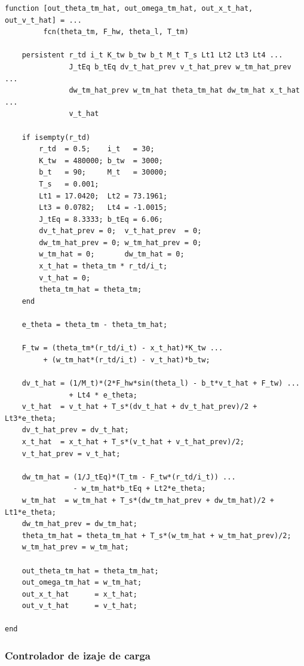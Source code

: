 \documentclass[12pt, a4paper]{article}
\begin{document}
\begin{lstlisting}[style=matlab, basicstyle=\ttfamily\scriptsize, caption={MATLAB Function: observador de Luenberger del carro ($T_{s2}=1$\,ms).}, label=lst:obs-carro]
function [out_theta_tm_hat, out_omega_tm_hat, out_x_t_hat, out_v_t_hat] = ...
         fcn(theta_tm, F_hw, theta_l, T_tm)

    persistent r_td i_t K_tw b_tw b_t M_t T_s Lt1 Lt2 Lt3 Lt4 ...
               J_tEq b_tEq dv_t_hat_prev v_t_hat_prev w_tm_hat_prev ...
               dw_tm_hat_prev w_tm_hat theta_tm_hat dw_tm_hat x_t_hat ...
               v_t_hat

    if isempty(r_td)
        r_td  = 0.5;    i_t   = 30;
        K_tw  = 480000; b_tw  = 3000;
        b_t   = 90;     M_t   = 30000;
        T_s   = 0.001;
        Lt1 = 17.0420;  Lt2 = 73.1961;
        Lt3 = 0.0782;   Lt4 = -1.0015;
        J_tEq = 8.3333; b_tEq = 6.06;
        dv_t_hat_prev = 0;  v_t_hat_prev  = 0;
        dw_tm_hat_prev = 0; w_tm_hat_prev = 0;
        w_tm_hat = 0;       dw_tm_hat = 0;
        x_t_hat = theta_tm * r_td/i_t;
        v_t_hat = 0;
        theta_tm_hat = theta_tm;
    end

    e_theta = theta_tm - theta_tm_hat;

    F_tw = (theta_tm*(r_td/i_t) - x_t_hat)*K_tw ...
         + (w_tm_hat*(r_td/i_t) - v_t_hat)*b_tw;

    dv_t_hat = (1/M_t)*(2*F_hw*sin(theta_l) - b_t*v_t_hat + F_tw) ...
               + Lt4 * e_theta;
    v_t_hat  = v_t_hat + T_s*(dv_t_hat + dv_t_hat_prev)/2 + Lt3*e_theta;
    dv_t_hat_prev = dv_t_hat;
    x_t_hat  = x_t_hat + T_s*(v_t_hat + v_t_hat_prev)/2;
    v_t_hat_prev = v_t_hat;

    dw_tm_hat = (1/J_tEq)*(T_tm - F_tw*(r_td/i_t)) ...
                - w_tm_hat*b_tEq + Lt2*e_theta;
    w_tm_hat  = w_tm_hat + T_s*(dw_tm_hat_prev + dw_tm_hat)/2 + Lt1*e_theta;
    dw_tm_hat_prev = dw_tm_hat;
    theta_tm_hat = theta_tm_hat + T_s*(w_tm_hat + w_tm_hat_prev)/2;
    w_tm_hat_prev = w_tm_hat;

    out_theta_tm_hat = theta_tm_hat;
    out_omega_tm_hat = w_tm_hat;
    out_x_t_hat      = x_t_hat;
    out_v_t_hat      = v_t_hat;

end
\end{lstlisting}

\subsubsection{Controlador de izaje de carga}
\end{document}
